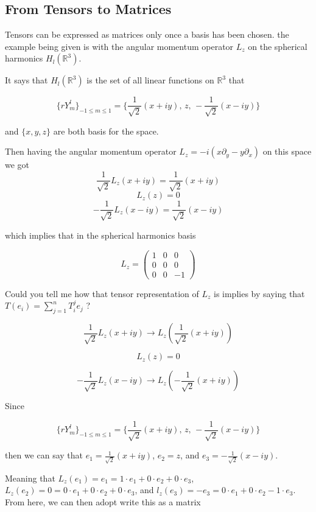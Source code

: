 \subsection{From Tensors to Matrices}

Tensors can be expressed as matrices only once a basis has been chosen.
the example being given is with the angular momentum operator $L_z$ on the spherical harmonics $H_l (\mathbb{R}^3)$.

It says that $H_l (\mathbb{R}^3)$ is the set of all linear functions on $\mathbb{R}^3$ that

$$
\{ r Y_{m}^{l} \}_{ -1 \leq m \leq 1 } =
\Big\{ \frac{1}{\sqrt{2}} (x +iy), \, z, \, - \frac{1}{\sqrt{2}} (x -iy) \Big\}
$$

and $\{ x, y, z \}$ are both basis for the space.

Then having the angular momentum operator $L_z = -i ( x\partial_y - y \partial_x )$ on this space we got
$$
\frac{1}{\sqrt{2}} L_z (x + iy) = \frac{1}{\sqrt{2}} (x + iy)
$$
$$
L_z (z) = 0
$$
$$
-\frac{1}{\sqrt{2}} L_z (x -iy) = \frac{1}{\sqrt{2}} (x -iy)
$$

which implies that in the spherical harmonics basis

$$
L_z = 
\begin{pmatrix}
1 & 0 & 0 \\
0 & 0 & 0 \\
0 & 0 & -1
\end{pmatrix}
$$

Could you tell me how that tensor representation of $L_z$ is implies by saying that
$T(e_i) = \sum^{n}_{j=1} T_{i}^{j} e_j$ ?


$$
\frac{1}{\sqrt{2}} L_z (x + iy)
\rightarrow
L_z \left( \frac{1}{\sqrt{2}} (x + iy) \right)
$$

$$
L_z (z) = 0
$$

$$
-\frac{1}{\sqrt{2}} L_z (x -iy)
\rightarrow
L_z \left( -\frac{1}{\sqrt{2}} (x + iy) \right)
$$

Since

$$
\{ r Y_{m}^{l} \}_{ -1 \leq m \leq 1 } =
\Big\{ \frac{1}{\sqrt{2}} (x +iy), \, z, \, - \frac{1}{\sqrt{2}} (x -iy) \Big\}
$$

then we can say that $e_1 = \frac{1}{\sqrt{2}} (x +iy)$, $e_2 = z$, and $e_3 = -\frac{1}{\sqrt{2}} (x -iy)$.

Meaning that $L_z (e_1) = e_1 = 1\cdot e_1 + 0\cdot e_2 + 0\cdot e_3$,
$L_z (e_2) = 0 = 0\cdot e_1 + 0\cdot e_2 + 0\cdot e_3$, and
$l_z (e_3) = -e_3 = 0\cdot e_1 + 0\cdot e_2 - 1\cdot e_3$.
From here, we can then adopt write this as a matrix

